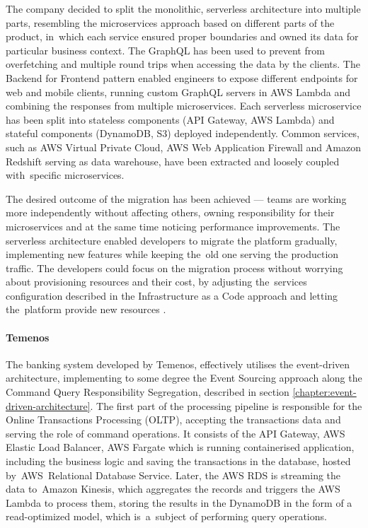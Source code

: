 The company decided to split the monolithic, serverless architecture into multiple parts, resembling the microservices approach based on different parts of the product, in~which each service ensured proper boundaries and owned its data for particular business context.
The GraphQL has been used to prevent from overfetching and multiple round trips when accessing the data by the clients.
The Backend for Frontend pattern enabled engineers to expose different endpoints for web and mobile clients, running custom GraphQL servers in AWS Lambda and combining the responses from multiple microservices.
Each serverless microservice has been split into stateless components (API Gateway, AWS Lambda) and stateful components (DynamoDB, S3) deployed independently.
Common services, such as AWS Virtual Private Cloud, AWS Web Application Firewall and Amazon Redshift serving as data warehouse, have been extracted and loosely coupled with~specific microservices.

The desired outcome of the migration has been achieved --- teams are working more independently without affecting others, owning responsibility for their microservices and at the same time noticing performance improvements.
The serverless architecture enabled developers to migrate the platform gradually, implementing new features while keeping the~old one serving the production traffic.
The developers could focus on the migration process without worrying about provisioning resources and their cost, by adjusting the~services configuration described in the Infrastructure as a Code approach and letting the~platform provide new resources \cite{ServerlessArchitectureOnAWS}.

\paragraph{Temenos} \label{chapter:serverless-suitability-temenos}

The banking system developed by Temenos, effectively utilises the event-driven architecture, implementing to some degree the Event Sourcing approach along the Command Query Responsibility Segregation, described in section \ref{chapter:event-driven-architecture}.
The first part of the processing pipeline is responsible for the Online Transactions Processing (OLTP), accepting the transactions data and serving the role of command operations. It consists of the API Gateway, AWS Elastic Load Balancer, AWS Fargate which is running containerised application, including the business logic and saving the transactions in the database, hosted by~AWS~Relational Database Service.
Later, the AWS RDS is streaming the data to~Amazon Kinesis, which aggregates the records and triggers the AWS Lambda to process them, storing the results in the DynamoDB in the form of a read-optimized model, which is~a~subject of performing query operations.

